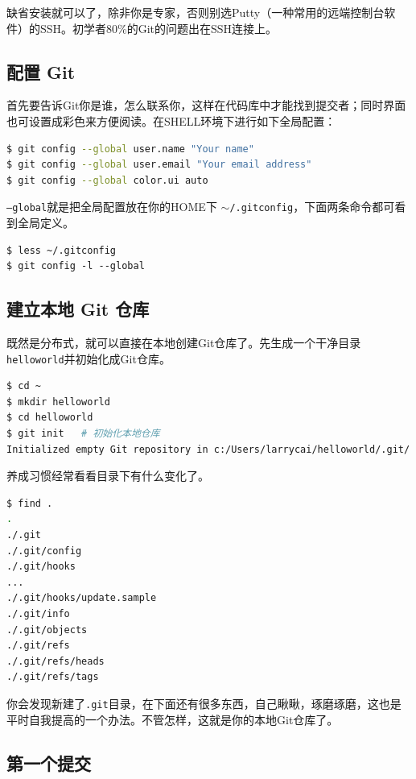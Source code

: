缺省安装就可以了，除非你是专家，否则别选Putty（一种常用的远端控制台软件）的SSH。初学者80\%的Git的问题出在SSH连接上。

\subsection{配置 Git}
\label{配置git}

首先要告诉Git你是谁，怎么联系你，这样在代码库中才能找到提交者；同时界面也可设置成彩色来方便阅读。在SHELL环境下进行如下全局配置：

\begin{lstlisting}[language=bash]
$ git config --global user.name "Your name"  
$ git config --global user.email "Your email address"
$ git config --global color.ui auto
\end{lstlisting}

\texttt{--global}就是把全局配置放在你的HOME下 \texttt{\ensuremath{\sim}\slash .gitconfig}，下面两条命令都可看到全局定义。

\begin{verbatim}
$ less ~/.gitconfig 
$ git config -l --global
\end{verbatim}

\subsection{建立本地 Git 仓库}
\label{建立本地git仓库}

既然是分布式，就可以直接在本地创建Git仓库了。先生成一个干净目录\texttt{helloworld}并初始化成Git仓库。

\begin{lstlisting}[language=bash]
$ cd ~
$ mkdir helloworld
$ cd helloworld
$ git init   # 初始化本地仓库
Initialized empty Git repository in c:/Users/larrycai/helloworld/.git/
\end{lstlisting}

养成习惯经常看看目录下有什么变化了。

\begin{lstlisting}[language=bash]
$ find .
.
./.git
./.git/config
./.git/hooks
...
./.git/hooks/update.sample
./.git/info
./.git/objects
./.git/refs
./.git/refs/heads
./.git/refs/tags
\end{lstlisting}

你会发现新建了\texttt{.git}目录，在下面还有很多东西，自己瞅瞅，琢磨琢磨，这也是平时自我提高的一个办法。不管怎样，这就是你的本地Git仓库了。

\subsection{第一个提交}
\label{第一个提交}


